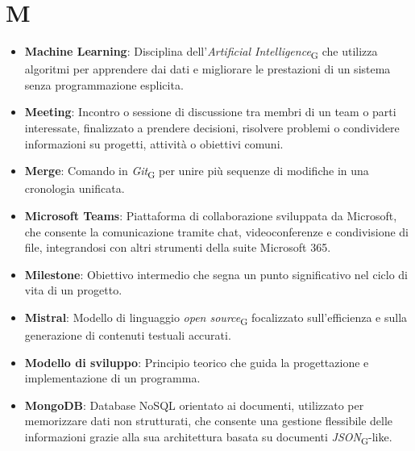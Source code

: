 \section*{M}  
\begin{itemize}
    \item \textbf{Machine Learning}: Disciplina dell'\textit{Artificial Intelligence}\textsubscript{G} che utilizza algoritmi per apprendere dai dati e migliorare le prestazioni di un sistema senza programmazione esplicita.
    \item \textbf{Meeting}: Incontro o sessione di discussione tra membri di un team o parti interessate, finalizzato a prendere decisioni, risolvere problemi o condividere informazioni su progetti, attività o obiettivi comuni.
    \item \textbf{Merge}: Comando in \textit{Git}\textsubscript{G} per unire più sequenze di modifiche in una cronologia unificata.
    \item \textbf{Microsoft Teams}: Piattaforma di collaborazione sviluppata da Microsoft, che consente la comunicazione tramite chat, videoconferenze e condivisione di file, integrandosi con altri strumenti della suite Microsoft 365.
    \item \textbf{Milestone}: Obiettivo intermedio che segna un punto significativo nel ciclo di vita di un progetto.
    \item \textbf{Mistral}: Modello di linguaggio \textit{open source}\textsubscript{G} focalizzato sull'efficienza e sulla generazione di contenuti testuali accurati.
    \item \textbf{Modello di sviluppo}: Principio teorico che guida la progettazione e implementazione di un programma.
    \item \textbf{MongoDB}: Database NoSQL orientato ai documenti, utilizzato per memorizzare dati non strutturati, che consente una gestione flessibile delle informazioni grazie alla sua architettura basata su documenti \textit{JSON}\textsubscript{G}-like.
\end{itemize}
